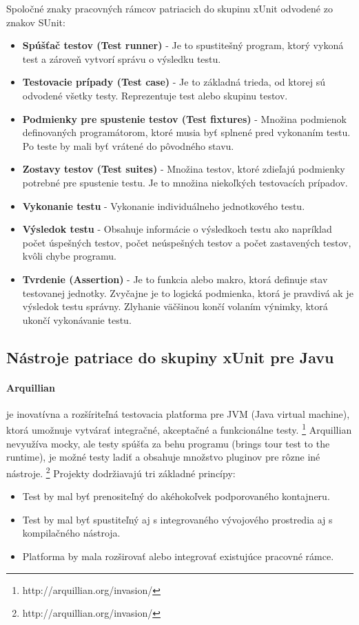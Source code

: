 \documentclass[11pt,twoside,slovak,a4paper]{article}
\begin{document}
		Spoločné znaky pracovných rámcov patriacich do skupinu xUnit odvodené zo znakov SUnit\cite{Brauer}:
		\begin{itemize}
			\item \textbf{Spúšťač testov (Test runner)} - Je to spustitešný program, ktorý vykoná test a zároveň vytvorí správu o výsledku testu.
			\item \textbf{Testovacie prípady (Test case)} - Je to základná trieda, od ktorej sú odvodené všetky testy. Reprezentuje test alebo skupinu testov.
			\item \textbf{Podmienky pre spustenie testov (Test fixtures)} - Množina podmienok definovaných programátorom, ktoré musia byť splnené pred vykonaním testu. Po teste by mali byť vrátené do pôvodného stavu.
			\item \textbf{Zostavy testov (Test suites)} - Množina testov, ktoré zdieľajú podmienky potrebné pre spustenie testu. Je to množina niekoľkých testovacích prípadov.
			\item \textbf{Vykonanie testu} - Vykonanie individuálneho jednotkového testu.
			\item \textbf{Výsledok testu} - Obsahuje informácie o výsledkoch testu ako napríklad počet úspešných testov, počet neúspešných testov a počet zastavených testov, kvôli chybe programu.
			\item \textbf{Tvrdenie (Assertion)} - Je to funkcia alebo makro, ktorá definuje stav testovanej jednotky. Zvyčajne je to logická podmienka, ktorá je pravdivá ak je výsledok testu správny. Zlyhanie väčšinou končí volaním výnimky, ktorá ukončí vykonávanie testu. 
		\end{itemize}
		
	\subsection{Nástroje patriace do skupiny xUnit pre Javu}
	\paragraph{Arquillian} je inovatívna a rozšíriteľná testovacia platforma pre JVM (Java virtual machine), ktorá umožnuje vytvárať integračné, akceptačné a funkcionálne testy. \footnote{http://arquillian.org/invasion/} Arquillian nevyužíva mocky, ale testy spúšťa za behu programu (brings tour test to the runtime), je možné testy ladiť a obsahuje množstvo pluginov pre rôzne iné nástroje. \footnote{http://arquillian.org/invasion/}
	Projekty dodržiavajú tri základné princípy:
	\begin{itemize}
		\item Test by mal byť prenositeľný do akéhokoľvek podporovaného kontajneru.
		\item Test by mal byť spustiteľný aj s integrovaného vývojového prostredia aj s kompilačného nástroja.
		\item Platforma by mala rozširovať alebo integrovať existujúce pracovné rámce.
	\end{itemize}
	
\end{document}

